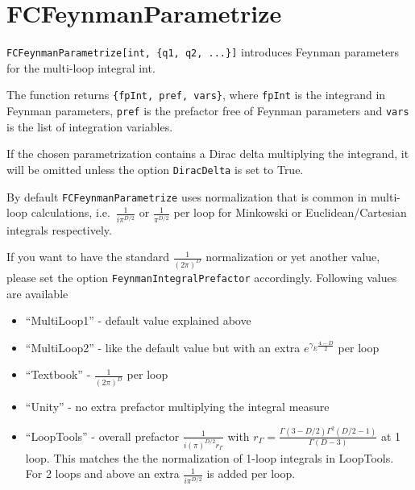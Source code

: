 \documentclass[../FeynCalcManual.tex]{subfiles}
\begin{document}
\begin{Shaded}
\begin{Highlighting}[]
 
\end{Highlighting}
\end{Shaded}

\hypertarget{fcfeynmanparametrize}{
\section{FCFeynmanParametrize}\label{fcfeynmanparametrize}}

\texttt{FCFeynmanParametrize[\allowbreak{}int,\ \allowbreak{}\{\allowbreak{}q1,\ \allowbreak{}q2,\ \allowbreak{}...\}]}
introduces Feynman parameters for the multi-loop integral int.

The function returns
\texttt{\{\allowbreak{}fpInt,\ \allowbreak{}pref,\ \allowbreak{}vars\}},
where \texttt{fpInt} is the integrand in Feynman parameters,
\texttt{pref} is the prefactor free of Feynman parameters and
\texttt{vars} is the list of integration variables.

If the chosen parametrization contains a Dirac delta multiplying the
integrand, it will be omitted unless the option \texttt{DiracDelta} is
set to True.

By default \texttt{FCFeynmanParametrize} uses normalization that is
common in multi-loop calculations, i.e.~\(\frac{1}{i \pi^{D/2}}\) or
\(\frac{1}{\pi^{D/2}}\) per loop for Minkowski or Euclidean/Cartesian
integrals respectively.

If you want to have the standard \(\frac{1}{(2 \pi)^D}\) normalization
or yet another value, please set the option
\texttt{FeynmanIntegralPrefactor} accordingly. Following values are
available

\begin{itemize}
\tightlist
\item
  ``MultiLoop1'' - default value explained above
\item
  ``MultiLoop2'' - like the default value but with an extra
  \(e^{\gamma_E \frac{4-D}{2}}\) per loop
\item
  ``Textbook'' - \(\frac{1}{(2 \pi)^D}\) per loop
\item
  ``Unity'' - no extra prefactor multiplying the integral measure
\item
  ``LoopTools'' - overall prefactor
  \(\frac{1}{i (\pi)^{D/2} r_{\Gamma}}\) with
  \(r_{\Gamma} = \frac{\Gamma(3-D/2) \Gamma^2 (D/2-1)}{\Gamma(D-3)}\) at
  1 loop. This matches the the normalization of 1-loop integrals in
  LoopTools. For 2 loops and above an extra \(\frac{1}{i \pi^{D/2}}\) is
  added per loop.
\end{itemize}
\end{document}
